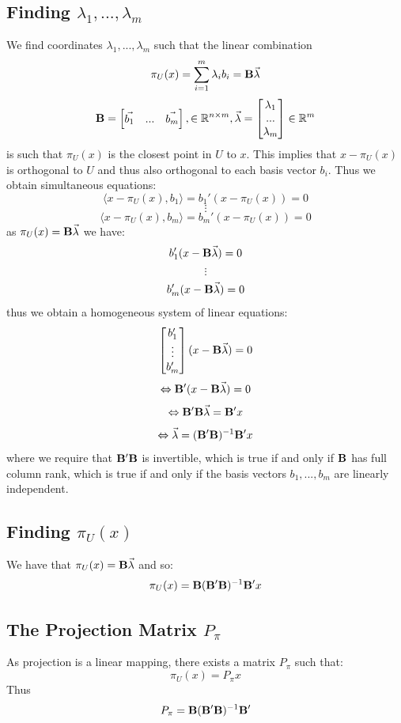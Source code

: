 \documentclass[DIV=14,titlepage=false]{scrreprt}
\begin{document}
\subsection{Finding \(\lambda_1,...,\lambda_m\)}
We find coordinates \(\lambda_1,...,\lambda_m\) such that the linear combination
\[\pi_U(x)=\sum_{i=1}^{m}\lambda_i b_i=\bold{B}\vec{\lambda}\]
\[\bold{B}=\begin{bmatrix}
  \vec{b_1} & ... & \vec{b_m}
\end{bmatrix}, \in \mathbb{R}^{n\times m}, \vec{\lambda}=\begin{bmatrix}
  \lambda_1 \\ ... \\ \lambda_m
\end{bmatrix} \in \mathbb{R}^m\]
is such that \(\pi_U(x)\) is the closest point in \(U\) to \(x\). This implies that \(x-\pi_U(x)\) is orthogonal to \(U\) and thus also orthogonal to each basis vector \(b_i\). Thus we obtain simultaneous equations:
\[\langle x-\pi_U(x),b_1 \rangle = b_1'(x-\pi_U(x))=0\]
\[\vdots\]
\[\langle x-\pi_U(x),b_m \rangle = b_m'(x-\pi_U(x))=0\] 
as \(\pi_U(x)=\bold{B}\vec{\lambda}\) we have:
\[b_1'(x-\bold{B}\vec{\lambda})=0\]
\[\vdots\]
\[b_m'(x-\bold{B}\vec{\lambda})=0\]
thus we obtain a homogeneous system of linear equations:
\[\begin{bmatrix}
  b_1' \\ \vdots \\ b_m'
\end{bmatrix}(x-\bold{B}\vec{\lambda})=0\]
\[\iff \bold{B}'(x-\bold{B}\vec{\lambda})=0\]
\[\iff \bold{B}'\bold{B}\vec{\lambda}=\bold{B}'x\]
\[\iff \vec{\lambda}=(\bold{B}'\bold{B})^{-1}\bold{B}'x\]
where we require that \(\bold{B}'\bold{B}\) is invertible, which is true if and only if \(\bold{B}\) has full column rank, which is true if and only if the basis vectors \(b_1,...,b_m\) are linearly independent.

\subsection{Finding \(\pi_U(x)\)}
We have that \(\pi_U(x)=\bold{B}\vec{\lambda}\) and so:
\[\pi_U(x)=\bold{B}(\bold{B}'\bold{B})^{-1}\bold{B}'x\]

\subsection{The Projection Matrix \(P_\pi\)}
As projection is a linear mapping, there exists a matrix \(P_\pi\) such that: \[\pi_U(x)=P_\pi x\]
Thus \[P_\pi=\bold{B}(\bold{B}'\bold{B})^{-1}\bold{B}'\]
\end{document}
